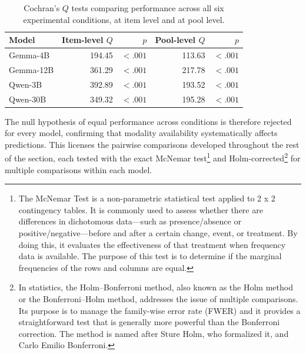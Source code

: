 \begin{table}[h]
    \centering
    \small
    \begin{tabular}{lrrrr}
        \hline
        \textbf{Model} &
        \textbf{Item-level $Q$} &
        \textbf{$p$} &
        \textbf{Pool-level $Q$} &
        \textbf{$p$} \\
        \hline
        Gemma-4B          & 194.45 & $<.001$ & 113.63 & $<.001$ \\
        Gemma-12B & 361.29 & $<.001$ & 217.78 & $<.001$ \\
        Qwen-3B        & 392.89 & $<.001$ & 193.52 & $<.001$ \\
        Qwen-30B    & 349.32 & $<.001$ & 195.28 & $<.001$ \\
        \hline
    \end{tabular}
    \caption{Cochran's $Q$ tests comparing performance across all six experimental conditions, at item level and at pool level.}
    \label{tab:cochran_conditions}
\end{table}
The null hypothesis of equal performance across conditions is therefore rejected for every model, confirming that modality availability systematically affects predictions. This licenses the pairwise comparisons developed throughout the rest of the section, each tested with the exact McNemar test\footnote{The McNemar Test is a non-parametric statistical test applied to 2 x 2 contingency tables. It is commonly used to assess whether there are differences in dichotomous data—such as presence/absence or positive/negative—before and after a certain change, event, or treatment. By doing this, it evaluates the effectiveness of that treatment when frequency data is available. The purpose of this test is to determine if the marginal frequencies of the rows and columns are equal.} and Holm-corrected\footnote{In statistics, the Holm–Bonferroni method, also known as the Holm method or the Bonferroni–Holm method, addresses the issue of multiple comparisons. Its purpose is to manage the family-wise error rate (FWER) and it provides a straightforward test that is generally more powerful than the Bonferroni correction. The method is named after Sture Holm, who formalized it, and Carlo Emilio Bonferroni.} for multiple comparisons within each model.
